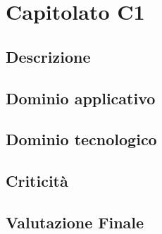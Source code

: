 \section {Capitolato C1}
	\subsection {Descrizione}
	\subsection {Dominio applicativo}
	\subsection {Dominio tecnologico}
	\subsection {Criticità}
	\subsection {Valutazione Finale}